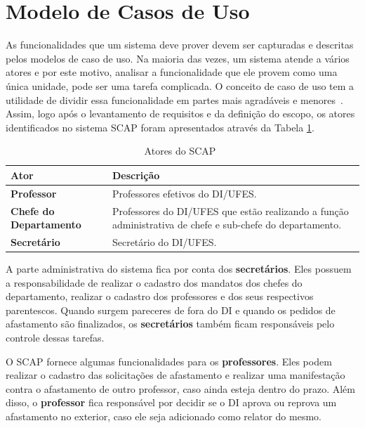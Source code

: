 \section{Modelo de Casos de Uso}
\label{sec-requisitos-modelo-caso-uso}

As funcionalidades que um sistema deve prover devem ser capturadas e descritas pelos modelos de caso de uso. Na maioria das vezes, um sistema atende a vários atores e por este motivo, analisar a funcionalidade que ele provem como uma única unidade, pode ser uma tarefa complicada. O conceito de caso de uso tem a utilidade de dividir essa funcionalidade em partes mais agradáveis e menores~\cite{olive:cmis07}. Assim, logo após o levantamento de requisitos e da definição do escopo, os atores identificados no sistema SCAP foram apresentados através da Tabela \ref{tabela-atores-scap}.  

\begin{table}[h]
	\centering	
	\vspace{0.5cm}
	\footnotesize
	\caption{Atores do SCAP~\cite{duarte-pg14}}	
	\label{tabela-atores-scap}
	\begin{tabular}{|p{5.0cm}|p{9.0cm}|}  \hline 
 		
 		\rowcolor[rgb]{0.8,0.8,0.8} \textbf{Ator} & \textbf{Descrição} \\\hline 
		
		\textbf{Professor} & Professores efetivos do DI/UFES. \\\hline
		
		\textbf{Chefe do Departamento} & Professores do DI/UFES que estão realizando a função administrativa de chefe e sub-chefe do departamento. \\\hline
		
		\textbf{Secretário} & Secretário do DI/UFES. \\\hline
		
	\end{tabular}
\end{table}

A parte administrativa do sistema fica por conta dos \textbf{secretários}. Eles possuem a responsabilidade de realizar o cadastro dos mandatos dos chefes do departamento, realizar o cadastro dos professores e dos seus respectivos parentescos. Quando surgem pareceres de fora do DI e quando os pedidos de afastamento são finalizados, os \textbf{secretários} também ficam responsáveis pelo controle dessas tarefas.

O SCAP fornece algumas funcionalidades para os \textbf{professores}. Eles podem realizar o cadastro das solicitações de afastamento e realizar uma manifestação contra o afastamento de outro professor, caso ainda esteja dentro do prazo. Além disso, o \textbf{professor} fica responsável por decidir se o DI aprova ou reprova um afastamento no exterior, caso ele seja adicionado como relator do mesmo. 

